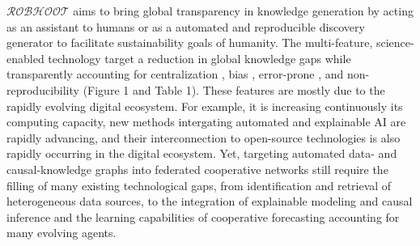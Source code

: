 \documentclass[11pt, a4paper]{article} %
\begin{document}
  $\mathcal{ROBHOOT}$ aims to bring global transparency in knowledge
  generation by acting as an assistant to humans or as a automated and
  reproducible discovery generator to facilitate sustainability goals
  of humanity. The multi-feature, science-enabled technology target a
  reduction in global knowledge gaps while transparently accounting
  for centralization \citep{Inhaber1977,Gunther2018}⁠⁠, bias⁠⁠
  \citep{Ioannidis2005}, error-prone \citep{Fang2011}, and
  non-reproducibility \citep{Hardwicke2018} (Figure 1 and Table
  1). These features are mostly due to the rapidly evolving digital
  ecosystem. For example, it is increasing continuously its computing
  capacity, new methods intergating automated and explainable AI are
  rapidly advancing, and their interconnection to open-source
  technologies is also rapidly occurring in the digital
  ecosystem. Yet, targeting automated data- and causal-knowledge
  graphs into federated cooperative networks still require the filling
  of many existing technological gaps, from identification and
  retrieval of heterogeneous data sources, to the integration of
  explainable modeling and causal inference and the learning
  capabilities of cooperative forecasting accounting for many evolving
  agents.

\end{document}
